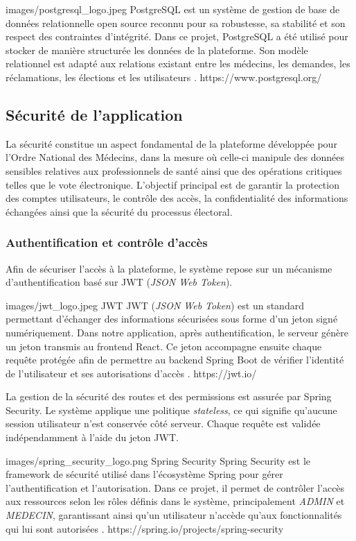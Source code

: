﻿\documentclass[12pt,a4paper]{report}
\begin{document}
\techno
{images/postgresql_logo.jpeg}
{PostgreSQL}
{est un système de gestion de base de données relationnelle open source
reconnu pour sa robustesse, sa stabilité et son respect des contraintes
d'intégrité. Dans ce projet, PostgreSQL a été utilisé pour stocker de manière
structurée les données de la plateforme. Son modèle relationnel est adapté aux
relations existant entre les médecins, les demandes, les réclamations, les
élections et les utilisateurs \cite{postgresDocs}.}
{https://www.postgresql.org/}


\subsection{Sécurité de l'application}

La sécurité constitue un aspect fondamental de la plateforme développée pour
l’Ordre National des Médecins, dans la mesure où celle-ci manipule des données
sensibles relatives aux professionnels de santé ainsi que des opérations
critiques telles que le vote électronique. L’objectif principal est de garantir
la protection des comptes utilisateurs, le contrôle des accès, la
confidentialité des informations échangées ainsi que la sécurité du processus
électoral.

\subsubsection{Authentification et contrôle d'accès}

Afin de sécuriser l’accès à la plateforme, le système repose sur un mécanisme
d’authentification basé sur JWT (\textit{JSON Web Token}).

\techno
{images/jwt_logo.jpeg}
{JWT}
{JWT (\textit{JSON Web Token}) est un standard permettant d’échanger des
informations sécurisées sous forme d’un jeton signé numériquement. Dans notre
application, après authentification, le serveur génère un jeton transmis au
frontend React. Ce jeton accompagne ensuite chaque requête protégée afin de
permettre au backend Spring Boot de vérifier l’identité de l’utilisateur et
ses autorisations d’accès \cite{jwtRFC}.}
{https://jwt.io/}

La gestion de la sécurité des routes et des permissions est assurée par Spring
Security. Le système applique une politique \textit{stateless}, ce qui signifie
qu’aucune session utilisateur n’est conservée côté serveur. Chaque requête est
validée indépendamment à l’aide du jeton JWT.

\techno
{images/spring_security_logo.png}
{Spring Security}
{Spring Security est le framework de sécurité utilisé dans l’écosystème Spring
pour gérer l’authentification et l’autorisation. Dans ce projet, il permet de
contrôler l’accès aux ressources selon les rôles définis dans le système,
principalement \textit{ADMIN} et \textit{MEDECIN}, garantissant ainsi qu’un
utilisateur n’accède qu’aux fonctionnalités qui lui sont autorisées
\cite{springSecurityDocs}.}
{https://spring.io/projects/spring-security}
\end{document}
